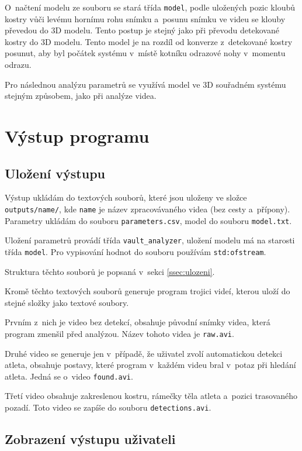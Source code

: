 O~načtení modelu ze souboru se stará třída \texttt{model}, podle uložených pozic kloubů kostry vůči levému hornímu rohu snímku a~posunu snímku ve videu se klouby převedou do 3D modelu. Tento postup je stejný jako při převodu detekované kostry do 3D modelu. Tento model je na rozdíl od konverze z~detekované kostry posunut, aby byl počátek systému v~místě kotníku odrazové nohy v~momentu odrazu.

Pro následnou analýzu parametrů se využívá model ve 3D souřadném systému stejným způsobem, jako při analýze videa.



\section{Výstup programu}

\subsection{Uložení výstupu}

Výstup ukládám do textových souborů, které jsou uloženy ve složce \texttt{outputs/\allowbreak name/}, kde \texttt{name} je název zpracovávaného videa (bez cesty a~přípony). Parametry ukládám do souboru \texttt{parameters.csv}, model do souboru \texttt{model.txt}.

Uložení parametrů provádí třída \texttt{vault\_analyzer}, uložení modelu má na starosti třída \texttt{model}. Pro vypisování hodnot do souboru používám \texttt{std\::ofstream}.

Struktura těchto souborů je popsaná v~sekci \ref{ssec:ulozeni}.

Kromě těchto textových souborů generuje program trojici videí, kterou uloží do stejné složky jako textové soubory.

Prvním z~nich je video bez detekcí, obsahuje původní snímky videa, která program zmenšil před analýzou. Název tohoto videa je \texttt{raw.avi}.

Druhé video se generuje jen v~případě, že uživatel zvolí automatickou detekci atleta, obsahuje postavy, které program v~každém videu bral v~potaz při hledání atleta. Jedná se o~video \texttt{found.avi}.

Třetí video obsahuje zakreslenou kostru, rámečky těla atleta a~pozici trasovaného pozadí. Toto video se zapíše do souboru \texttt{detections.avi}.



\subsection{Zobrazení výstupu uživateli}

